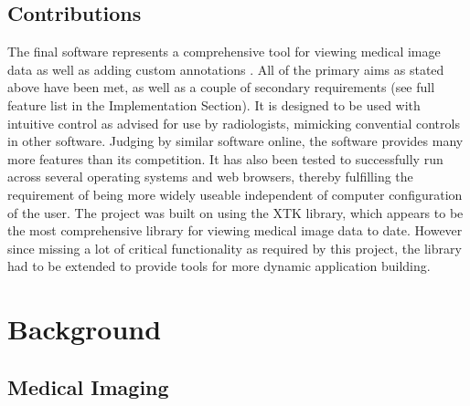 \documentclass[a4paper,11pt,titlepage]{article}
\begin{document}
\subsection{Contributions}

The final software represents a comprehensive tool for viewing medical image data as well as adding custom annotations . All of the primary aims as stated above have been met, as well as a couple of secondary requirements (see full feature list in the Implementation Section). It is designed to be used with intuitive control as advised for use by radiologists, mimicking convential controls in other software. Judging by similar software online, the software provides many more features than its competition. It has also been tested to successfully run across several operating systems and web browsers, thereby fulfilling the requirement of being more widely useable independent of computer configuration of the user. The project was built on using the XTK library, which appears to be the most comprehensive library for viewing medical image data to date. However since missing a lot of critical functionality as required by this project, the library had to be extended to provide tools for more dynamic application building.


\section{Background}



\subsection{Medical Imaging}
\end{document}

